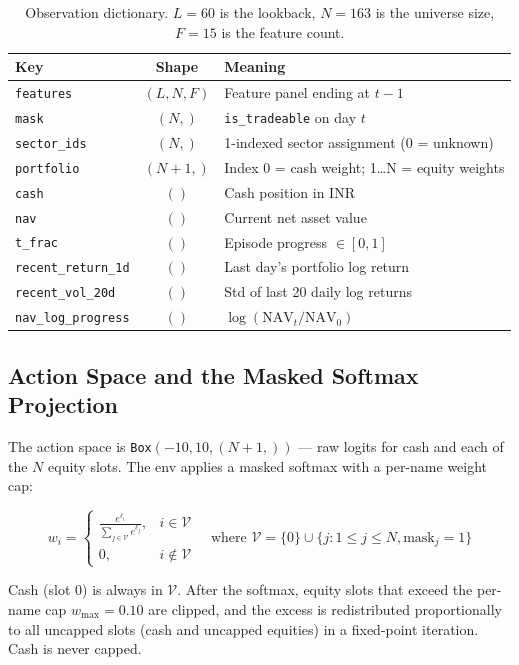 \documentclass[11pt,a4paper]{article}
\begin{document}
\begin{table}[h]
\centering
\caption{Observation dictionary. $L = 60$ is the lookback, $N = 163$ is the universe
size, $F = 15$ is the feature count.}
\label{tab:obs}
\small
\begin{tabularx}{\textwidth}{l c X}
\toprule
\textbf{Key} & \textbf{Shape} & \textbf{Meaning} \\
\midrule
\texttt{features} & $(L, N, F)$ & Feature panel ending at $t-1$ \\
\texttt{mask} & $(N,)$ & \texttt{is\_tradeable} on day $t$ \\
\texttt{sector\_ids} & $(N,)$ & 1-indexed sector assignment (0 = unknown) \\
\texttt{portfolio} & $(N+1,)$ & Index 0 = cash weight; 1\ldots N = equity weights \\
\texttt{cash} & $()$ & Cash position in INR \\
\texttt{nav} & $()$ & Current net asset value \\
\texttt{t\_frac} & $()$ & Episode progress $\in [0, 1]$ \\
\texttt{recent\_return\_1d} & $()$ & Last day's portfolio log return \\
\texttt{recent\_vol\_20d} & $()$ & Std of last 20 daily log returns \\
\texttt{nav\_log\_progress} & $()$ & $\log(\text{NAV}_t / \text{NAV}_0)$ \\
\bottomrule
\end{tabularx}
\end{table}

\subsection{Action Space and the Masked Softmax Projection}

The action space is \texttt{Box}$(-10, 10, (N+1,))$ --- raw logits for cash and each
of the $N$ equity slots. The env applies a masked softmax with a per-name weight cap:

\begin{equation}
w_i = \begin{cases}
\frac{e^{\ell_i}}{\sum_{j \in \mathcal{V}} e^{\ell_j}}, & i \in \mathcal{V} \\
0, & i \notin \mathcal{V}
\end{cases}
\quad\text{where } \mathcal{V} = \{0\} \cup \{j : 1 \le j \le N, \text{mask}_j = 1\}
\end{equation}

Cash (slot 0) is always in $\mathcal{V}$. After the softmax, equity slots that
exceed the per-name cap $w_{\max} = 0.10$ are clipped, and the excess is
redistributed proportionally to all uncapped slots (cash and uncapped equities)
in a fixed-point iteration. Cash is never capped.
\end{document}
